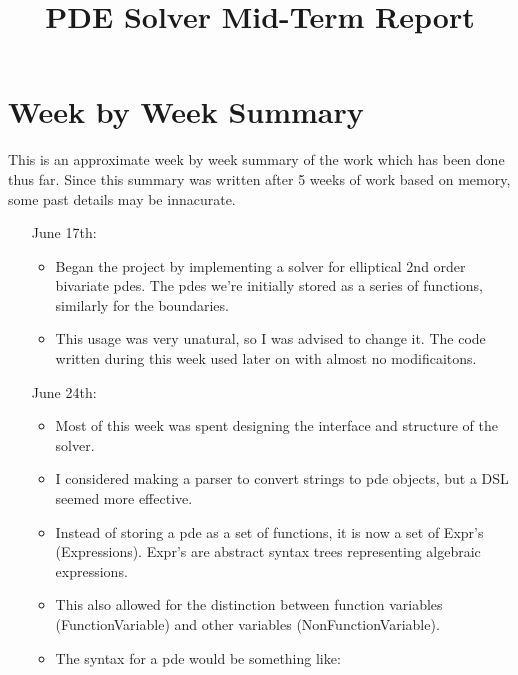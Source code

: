 \documentclass[12pt]{article}
\title{PDE Solver Mid-Term Report}
\date{}
\begin{document}
\maketitle
\newcommand{\expr}{{\ttfamily Expr}}
\newcommand{\code}[1]{{\ttfamily #1}}

\section{Week by Week Summary}
This is an approximate week by week summary of the work which has been
done thus far. Since this summary was written after 5 weeks of work
based on memory, some past details may be innacurate. 
\begin{itemize}
    
    
\item[June 17th:] \begin{itemize}
        
    \item Began the project by implementing a solver for elliptical
        2nd order bivariate pdes. The pdes we're initially stored as a
        series of functions, similarly for the boundaries.
    \item This usage was very unatural, so I was advised to change
        it. The code written during this week used later on with
        almost no modificaitons.
    \end{itemize}
    
    
\item[June 24th:]\begin{itemize}
        
    \item Most of this week was spent designing the interface and structure of the
        solver.

    \item I considered making a parser to convert strings to pde
        objects, but a DSL seemed more effective. 
        
    \item Instead of storing a pde as a set of functions, it is now a
        set of \expr's (Expressions). \expr's are abstract syntax
        trees representing algebraic expressions.
        
    \item This also allowed for the distinction between function
        variables (\code{FunctionVariable}) and other variables
        (\code{NonFunctionVariable}).

    \item The syntax for a pde would be something like:
        

\end{itemize}
\end{itemize}
\end{document}
